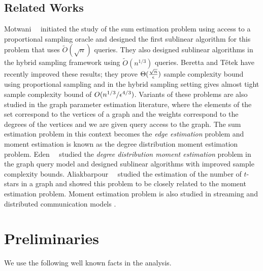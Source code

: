 \subsection{Related Works} Motwani~\etal~\cite{MPX2007} initiated the study of the sum estimation problem using access to a proportional sampling oracle and designed the first sublinear algorithm for this problem that uses $\tilde{O}(\sqrt{n})$ queries. They also designed sublinear algorithms in the hybrid sampling framework using $\tilde{O}(n^{1/3})$ queries. Beretta and T{\v{e}}tek \cite{BT2022} have recently improved these results; they prove $\Theta(\frac{\sqrt{n}}{\epsilon})$ sample complexity bound using proportional sampling and in the hybrid sampling setting gives almost tight sample complexity bound of $O(n^{1/3}/\epsilon^{4/3})$. Variants of these problems are also studied in the graph parameter estimation literature, where the elements of the set correspond to the vertices of a graph and the weights correspond to the degrees of the vertices and we are given query access to the graph. The sum estimation problem in this context becomes the {\it edge estimation} problem and moment estimation is known as the degree distribution moment estimation problem. Eden~\etal~\cite{ERS2018,ERS2019} studied the {\it degree distribution moment estimation} problem in the graph query model and designed sublinear algorithms with improved sample complexity bounds. Aliakbarpour~\etal~\cite{ABGPRY2018} studied the estimation of the number of $t$-stars in a graph and showed this problem to be closely related to the moment estimation problem. Moment estimation problem is also studied in streaming and distributed communication models \cite{AMS1999,JW2023}.


\section{Preliminaries} We use the following well known facts in the analysis.

